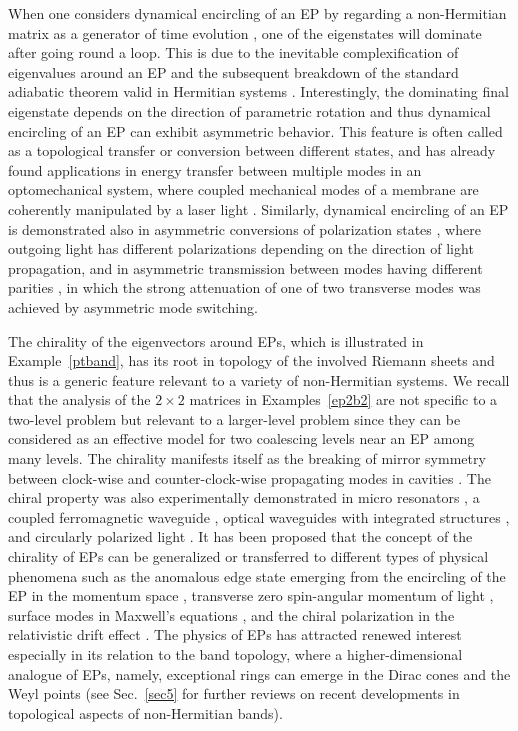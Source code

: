 \documentclass{tADP2e}
\theoremstyle{plain}
\theoremstyle{plain}
\theoremstyle{definition}
\begin{document}
When one considers dynamical encircling of an EP by regarding a non-Hermitian matrix as a generator of time evolution \cite{HWD98}, one of the eigenstates will dominate after going round a loop. This is due to the inevitable complexification of eigenvalues around an EP and the subsequent breakdown of the standard adiabatic theorem valid in Hermitian systems \cite{Uzdin_2011,GEM13,MT15}. Interestingly, the dominating final eigenstate depends on the direction of parametric rotation and thus dynamical encircling of an EP can exhibit asymmetric behavior. This feature is often called as a topological transfer or conversion between different states, and has already found applications in energy transfer between multiple modes in an optomechanical system, where coupled mechanical modes of a membrane are coherently manipulated by a laser light \cite{GS16,HX2016}. Similarly, dynamical encircling of an EP is demonstrated also in asymmetric conversions of polarization states \cite{HAU17}, where outgoing light has different polarizations depending on the direction of light propagation, and in asymmetric transmission between modes having different parities \cite{DJ16}, in which the strong attenuation of one of two transverse modes was achieved by asymmetric mode switching.

The chirality of the eigenvectors around EPs, which is illustrated in Example~\ref{ptband},  has its root in topology of the involved Riemann sheets and thus is a generic feature relevant to a variety of non-Hermitian systems. We recall that the analysis of the $2\times 2$ matrices in Examples~\ref{ep2b2} are not specific to a two-level problem but relevant to a larger-level problem since they can be considered as an effective model for two coalescing levels near an EP among many levels.
The chirality manifests itself as the breaking of mirror symmetry between clock-wise and counter-clock-wise propagating modes in cavities \cite{LJM14,PB16,SWR19}.  The chiral property was also experimentally demonstrated in micro resonators \cite{DC04}, a coupled ferromagnetic waveguide \cite{ZXL18}, optical waveguides with integrated  structures \cite{YJW18,ZXL19}, and circularly polarized light \cite{CA172,BB18}. It has been proposed that the concept of the chirality of EPs can be generalized or transferred to different types of physical phenomena such as  the anomalous edge state emerging from the encircling of the EP in the momentum space \cite{LTE16},  transverse zero spin-angular momentum of light \cite{PX18}, surface modes in Maxwell's equations \cite{BKY19}, and the chiral polarization in the relativistic drift effect \cite{KH98,YS16}. The physics of EPs has attracted renewed interest especially in its relation to the band topology, where a higher-dimensional analogue of EPs, namely, exceptional rings can emerge in  the Dirac cones \cite{ZB15}  and the Weyl points \cite{XY17} (see Sec.~\ref{sec5} for further reviews on recent developments in topological aspects of non-Hermitian bands).
\end{document}
